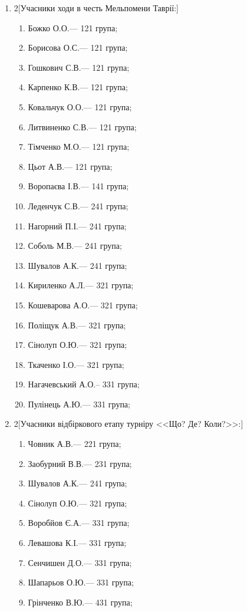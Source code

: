 \documentclass[
	a4paper,
	12pt,
	oneside,
	draft
]{extreport}
\begin{document}
\begin{enumerate}[topsep=0pt,itemsep=-1ex,partopsep=0ex,parsep=1ex]


\item 
\begin{multicols}{2}[Учасники ходи в честь Мельпомени Таврії:] 
\begin{enumerate}[topsep=0pt,itemsep=-1ex,partopsep=0ex,parsep=1ex,label=\arabic*.]
\item Божко О.О.\hfill --- 121 група;
\item Борисова О.С.\hfill --- 121 група;
\item Гошкович С.В.\hfill --- 121 група;
\item Карпенко К.В.\hfill --- 121 група;
\item Ковальчук О.О.\hfill --- 121 група;
\item Литвиненко С.В.\hfill --- 121 група;
\item Тімченко М.О.\hfill --- 121 група;
\item Цьот А.В.\hfill --- 121 група;
\item Воропаєва І.В.\hfill --- 141 група;
\item Леденчук С.В.\hfill --- 241 група;
\item Нагорний П.І.\hfill --- 241 група;
\item Соболь М.В.\hfill --- 241 група;
\item Шувалов А.К.\hfill --- 241 група;
\item Кириленко А.Л.\hfill --- 321 група;
\item Кошеварова А.О.\hfill --- 321 група;
\item Поліщук А.В.\hfill --- 321 група;
\item Сінолуп О.Ю.\hfill --- 321 група;
\item Ткаченко І.О.\hfill --- 321 група;
\item Нагачевський А.О.\hfill -- 331 група;
\item Пулінець А.Ю.\hfill --- 331 група;
\end{enumerate}
\end{multicols}

\item 
\begin{multicols}{2}[Учасники відбіркового етапу турніру <<Що? Де? Коли?>>:] 
\begin{enumerate}[topsep=0pt,itemsep=-1ex,partopsep=0ex,parsep=1ex,label=\arabic*.]
\item Човник А.В.\hfill --- 221 група;
\item Заобурний В.В.\hfill --- 231 група;
\item Шувалов А.К.\hfill --- 241 група;
\item Сінолуп О.Ю.\hfill --- 321 група;
\item Воробйов Є.А.\hfill --- 331 група;
\item Левашова К.І.\hfill --- 331 група;
\item Сенчишен Д.О.\hfill --- 331 група;
\item Шапарьов О.Ю.\hfill --- 331 група;
\item Грінченко В.Ю.\hfill --- 431 група;
\end{enumerate}
\end{multicols}


\end{enumerate}
\end{document}
